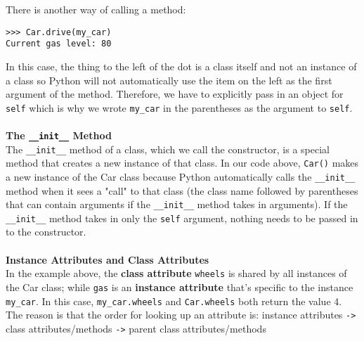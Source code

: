 There is another way of calling a method:
\begin{lstlisting}
>>> Car.drive(my_car)
Current gas level: 80
\end{lstlisting}
In this case, the thing to the left of the dot is a class itself and not an instance of a class so Python will not automatically use the item on the left as the first argument of the method. Therefore, we have to explicitly pass in an object for \lstinline{self} which is why we wrote \lstinline{my_car} in the parentheses as the argument to \lstinline{self}. \\
\\
\textbf{The \lstinline{__init__} Method} \\
The \lstinline{__init__} method of a class, which we call the constructor, is a special method that creates a new instance of that class. In our code above, \lstinline{Car()} makes a new instance of the Car class because Python automatically calls the \lstinline{__init__} method when it sees a "call" to that class (the class name followed by parentheses that can contain arguments if the \lstinline{__init__} method takes in arguments). If the \lstinline{__init__} method takes in only the \lstinline{self} argument, nothing needs to be passed in to the constructor. \\
\\
\textbf{Instance Attributes and Class Attributes} \\
In the example above, the \textbf{class attribute} \lstinline{wheels} is shared by all instances of the Car class; while \lstinline{gas} is an \textbf{instance attribute} that’s specific to the instance \lstinline{my_car}.
In this case, \lstinline{my_car.wheels} and \lstinline{Car.wheels} both return the value 4. The reason is that the order for looking up an attribute is: instance attributes \lstinline{->} class attributes/methods \lstinline{->} parent class attributes/methods \\
